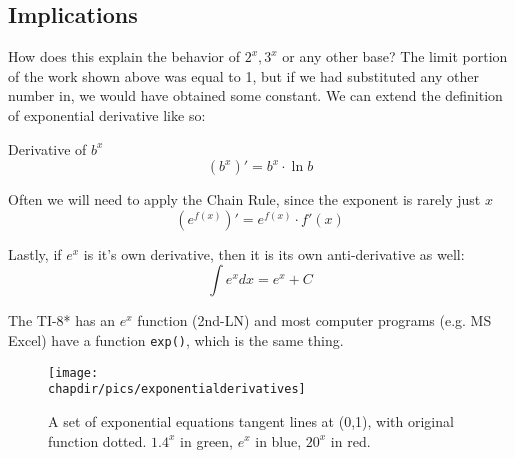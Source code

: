 \subsection{Implications}
How does this explain the behavior of $2^x, 3^x$ or any other base?  The limit portion of
the work shown above was equal to 1, but if we had substituted any other number in,
we would have obtained some constant.  We can extend the definition of exponential
derivative like so:

\begin{derivation}{Derivative of $b^x$}
$$
(b^x)' = b^x \cdot{} \ln{b}
$$
\end{derivation}

Often we will need to apply the Chain Rule, since the exponent is rarely just $x$
$$
\left(e^{f(x)}\right)' = e^{f(x)} \cdot f'(x)
$$

Lastly, if $e^x$ is it's own derivative, then it is its own anti-derivative as well:
$$
\int e^xdx = e^x + C
$$

The TI-8* has an $e^x$ function (2nd-LN) and most computer programs (e.g. MS Excel)
have a function \texttt{exp()}, which is the same thing.

\begin{figure}
\begin{centering}
\texttt{[image: \\chapdir/pics/exponentialderivatives]}
\caption[Exponential tangent lines at (0,1)]{A set of exponential equations tangent lines at (0,1), with original function dotted.  $1.4^x$ in green, $e^x$ in blue, $20^x$ in red.}
\end{centering}
\end{figure}
